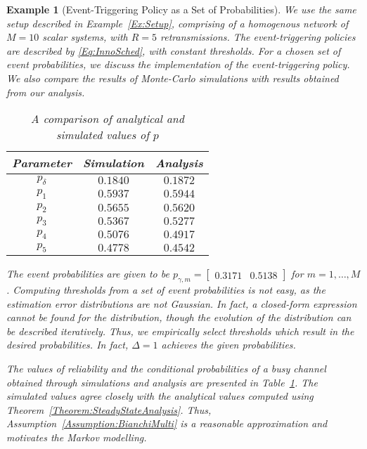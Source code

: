 \documentclass[journal]{IEEEtran}
\newtheorem{example}{Example}[section]
\begin{document}
\begin{example}[Event-Triggering Policy as a Set of Probabilities] \label{Ex:Setup2}
We use the same setup described in Example~\ref{Ex:Setup}, comprising of a homogenous network of $M=10$ scalar systems, with $R=5$ retransmissions. The event-triggering policies are described by \eqref{Eq:InnoSched}, with constant thresholds. For a chosen set of event probabilities, we discuss the implementation of the event-triggering policy. We also compare the results of Monte-Carlo simulations with results obtained from our analysis.

\begin{table}[!t]
\begin{center}
\caption{A comparison of analytical and simulated values of $p$}\label{Tb:SimResults}
\begin{tabular}{c | c c}
\hline\hline Parameter & Simulation & Analysis \\ \hline
$p_\delta$ & $0.1840$ & $0.1872$ \\
$p_1$ & $0.5937$ & $0.5944$ \\
$p_2$ & $0.5655$ & $0.5620$ \\
$p_3$ & $0.5367$ & $0.5277$ \\
$p_4$ & $0.5076$ & $0.4917$ \\
$p_5$ & $0.4778$ & $0.4542$ \\
\hline
\end{tabular}
\end{center}
\vspace{-2mm}
\end{table}

The event probabilities are given to be $p_{\gamma,m} = \begin{bmatrix} 0.3171 & 0.5138 \end{bmatrix}$ for $m = 1,\dots,M$. Computing thresholds from a set of event probabilities is not easy, as the estimation error distributions are not Gaussian. In fact, a closed-form expression cannot be found for the distribution, though the evolution of the distribution can be described iteratively. Thus, we empirically select thresholds which result in the desired probabilities. In fact, $\Delta = 1$ achieves the given probabilities.

The values of reliability and the conditional probabilities of a busy channel obtained through simulations and analysis are presented in Table~\ref{Tb:SimResults}. The simulated values agree closely with the analytical values computed using Theorem~\ref{Theorem:SteadyStateAnalysis}. Thus, Assumption~\ref{Assumption:BianchiMulti} is a reasonable approximation and motivates the Markov modelling.
\end{example}
\end{document}
